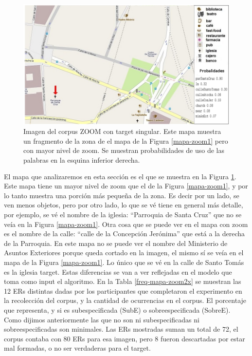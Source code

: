\begin{figure}[H]
\centering
\includegraphics[width=\textwidth]{images/corpus/mapa16-prob.png}
\caption{Imagen del corpus ZOOM con target singular. Este mapa muestra un fragmento de la zona de el mapa de la Figura \ref{mapa-zoom1} pero con mayor nivel de zoom. Se muestran probabilidades de uso de las palabras en la esquina inferior derecha.}
\label{mapa-zoom2x}
\end{figure}
El mapa que analizaremos en esta secci\'on es el que se muestra en la Figura \ref{mapa-zoom2x}. Este mapa tiene un mayor nivel de zoom que el de la Figura \ref{mapa-zoom1}, y por lo tanto muestra una porci\'on m\'as peque\~na de la zona. Es decir por un lado, se ven menos objetos, pero por otro lado, lo que se v\'e tiene en general m\'as detalle, por ejemplo, se v\'e el nombre de la iglesia:
 ``Parroquia de Santa Cruz'' que no se ve\'ia en la Figura \ref{mapa-zoom1}. Otra cosa 
que se puede ver en el mapa con zoom es el nombre de la calle: ``calle de la Concepci\'on Jer\'onima'' que est\'a a la derecha de la Parroquia.
En este mapa no se puede ver el nombre del Ministerio de Asuntos Exteriores porque queda cortado en la imagen, el mismo s\'i se ve\'ia en el mapa de la Figura \ref{mapa-zoom1}. Lo \'unico que se v\'e en la calle de Santo Tom\'as es la iglesia target. Estas diferencias se van a ver reflejadas en el modelo que toma como input el algoritmo.
En la Tabla \ref{freq-mapa-zoom2x} se muestran las 12 ERs distintas dadas por los participantes que completaron el experimento en la recolecci\'on del corpus, y la cantidad de ocurrencias en el corpus. El porcentaje que representa, y si es subespecificada (SubE) o sobreespecificada (SobreE). Como dijimos anteriormente las que no son ni subespecificadas ni sobreespecificadas son minimales. Las ERs mostradas suman un total de 72, el corpus contaba con 80 ERs para esa imagen, pero 8 fueron descartadas por estar mal formadas, o no ser verdaderas para el target.

